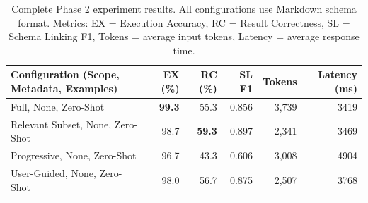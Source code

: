 \begin{table}[t]
\centering
\caption{Complete Phase 2 experiment results. All configurations use Markdown schema format. Metrics: EX = Execution Accuracy, RC = Result Correctness, SL = Schema Linking F1, Tokens = average input tokens, Latency = average response time.}
\label{tab:complete_results}
\footnotesize
\begin{tabular}{lrrrrr}
\toprule
Configuration (Scope, Metadata, Examples) & EX (\%) & RC (\%) & SL F1 & Tokens & Latency (ms) \\
\midrule
Full, None, Zero-Shot & \textbf{99.3} & 55.3 & 0.856 & 3,739 & 3419 \\
Relevant Subset, None, Zero-Shot & 98.7 & \textbf{59.3} & 0.897 & 2,341 & 3469 \\
Progressive, None, Zero-Shot & 96.7 & 43.3 & 0.606 & 3,008 & 4904 \\
User-Guided, None, Zero-Shot & 98.0 & 56.7 & 0.875 & 2,507 & 3768 \\
\bottomrule
\end{tabular}
\end{table}